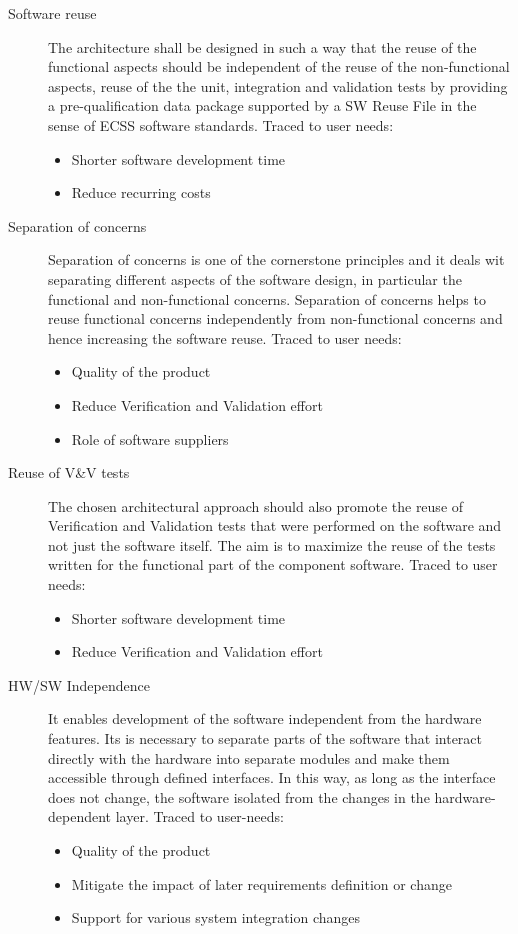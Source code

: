 \begin{description}
\item [Software reuse] The architecture shall be designed in such a way that the reuse of the functional aspects should be independent of the reuse of the non-functional aspects, reuse of the the unit, integration and validation tests by providing  a pre-qualification data package supported by a SW Reuse File in the sense of ECSS software standards. Traced to user needs:
\begin{itemize}
\item Shorter software development time
\item Reduce recurring costs
\end{itemize}
 
\item [Separation of concerns] Separation of concerns is one of the cornerstone principles and it deals wit separating different aspects of the software design, in particular the functional and non-functional concerns. Separation of concerns helps to reuse functional concerns independently from non-functional concerns and hence increasing the software reuse. Traced to user needs:
\begin{itemize}
\item Quality of the product
\item Reduce Verification and Validation effort
\item Role of software suppliers 
\end{itemize} 
 
\item [Reuse of V\&V tests] The chosen architectural approach should also promote the reuse of Verification and Validation tests that were performed on the software and not just the software itself. The aim is to maximize the reuse of the tests written for the functional part of the component software. Traced to user needs:
\begin{itemize}
\item Shorter software development time
\item Reduce Verification and Validation effort 
\end{itemize}

\item [HW/SW Independence] It enables development of the software independent from the hardware features. Its is necessary to separate parts of the software that interact directly with the hardware into separate modules and make them accessible through defined interfaces. In this way, as long as the interface does not change, the software isolated from the changes in the hardware-dependent layer. Traced to user-needs:
\begin{itemize}
\item Quality of the product
\item Mitigate the impact of later requirements definition or change 
\item Support for various system integration changes
\end{itemize}
	  	

\end{description}
